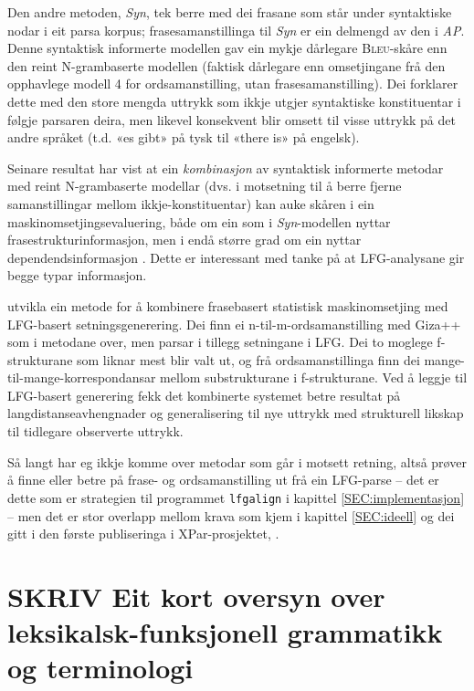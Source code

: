 \documentclass[11pt,a4paper,oneside,draft]{book}
\newcommand{\Bleu}{\textsc{Bleu}}
\begin{document}
Den andre metoden, \emph{Syn}, tek berre med dei frasane som står under
syntaktiske nodar i eit parsa korpus; frasesamanstillinga til \emph{Syn} er
ein delmengd av den i \emph{AP}. Denne syntaktisk informerte modellen gav
ein mykje dårlegare \Bleu-skåre enn den reint N-grambaserte modellen
(faktisk dårlegare enn omsetjingane frå den opphavlege modell 4 for
ordsamanstilling, utan frasesamanstilling). Dei forklarer dette med
den store mengda uttrykk som ikkje utgjer syntaktiske konstituentar i
følgje parsaren deira, men likevel konsekvent blir omsett til visse
uttrykk på det andre språket (t.d. «es gibt» på tysk til «there is» på
engelsk).

Seinare resultat har vist at ein \emph{kombinasjon} av syntaktisk
informerte metodar med reint N-grambaserte modellar (dvs. i motsetning
til å berre fjerne samanstillingar mellom ikkje-konstituentar) kan
auke skåren i ein maskinomsetjingsevaluering, både om ein som i
\emph{Syn}-modellen nyttar frasestrukturinformasjon, men i endå større
grad om ein nyttar dependendsinformasjon
\citep{tinsley2007ept,hearne2008ccd}. Dette er interessant med tanke
på at LFG-analysane gir begge typar informasjon.

\citet{riezler2006gmt} utvikla ein metode for å kombinere frasebasert
statistisk maskinomsetjing med LFG-basert setningsgenerering. Dei finn
ei n-til-m-ordsamanstilling med Giza++ som i metodane over, men parsar
i tillegg setningane i LFG. Dei to moglege f-strukturane som liknar
mest blir valt ut, og frå ordsamanstillinga finn dei
mange-til-mange-korrespondansar mellom substrukturane i
f-strukturane. Ved å leggje til LFG-basert generering fekk det
kombinerte systemet betre resultat på langdistanseavhengnader og
generalisering til nye uttrykk med strukturell likskap til tidlegare
observerte uttrykk.

Så langt har eg ikkje komme over metodar som går i motsett retning,
altså prøver å finne eller betre på frase- og ordsamanstilling ut frå
ein LFG-parse -- det er dette som er strategien til programmet
\texttt{lfgalign} i kapittel \ref{SEC:implementasjon} -- men det er stor
overlapp mellom krava som kjem i kapittel \ref{SEC:ideell} og dei gitt
i den første publiseringa i XPar-prosjektet, \citet{dyvik2009lmp}.


\section{\textbf{SKRIV} Eit kort oversyn over leksikalsk-funksjonell grammatikk og terminologi}
\label{sec-2.2}
\end{document}
